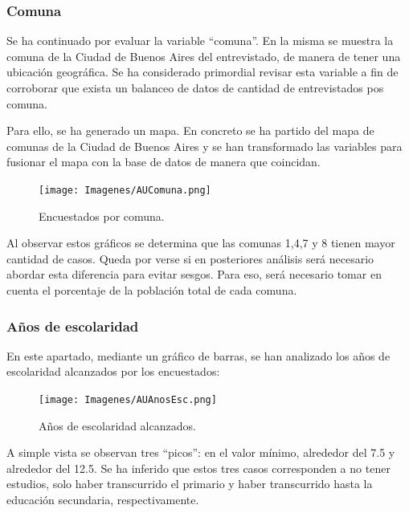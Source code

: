 \documentclass[a4paper]{article}
\begin{document}
            \subsubsection{Comuna}
           
            Se ha continuado por evaluar la variable ``comuna''. En la misma se muestra la comuna de la Ciudad de Buenos Aires del entrevistado, de manera de tener una ubicación geográfica. Se ha considerado primordial revisar esta variable a fin de corroborar que exista un balanceo de datos de cantidad de entrevistados pos comuna.
           
            Para ello, se ha generado un mapa. En concreto se ha partido del mapa de comunas de la Ciudad de Buenos Aires y se han transformado las variables para fusionar el mapa con la base de datos de manera que coincidan.
           
            \begin{figure}  [H]
                \centering
                \texttt{[image: Imagenes/AUComuna.png]}  
                \caption{Encuestados por comuna.}
                \label{AU comuna}
            \end{figure}
 
            Al observar estos gráficos se determina que las comunas 1,4,7 y 8 tienen mayor cantidad de casos. Queda por verse si en posteriores análisis será necesario abordar esta diferencia para evitar sesgos. Para eso, será necesario tomar en cuenta el porcentaje de la población total de cada comuna.
           

            \subsubsection{Años de escolaridad}
           
            En este apartado, mediante un gráfico de barras, se han analizado los años de escolaridad alcanzados por los encuestados:
           
            \begin{figure}[H]
                \centering
                \texttt{[image: Imagenes/AUAnosEsc.png]}
                \caption{Años de escolaridad alcanzados.}
                \label{AU years of scholarship}
            \end{figure}
           
            A simple vista se observan tres ``picos'': en el valor mínimo, alrededor del 7.5 y alrededor del 12.5. Se ha inferido que estos tres casos corresponden a no tener estudios, solo haber transcurrido el primario y haber transcurrido hasta la educación secundaria, respectivamente.
           
\end{document}
